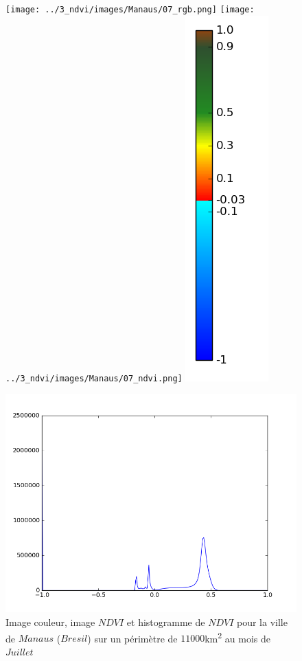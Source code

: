 \documentclass{book}
\begin{document}
\begin{figure}[H]
\centerline{
\texttt{[image: ../3\_ndvi/images/Manaus/07\_rgb.png]}
\texttt{[image: ../3\_ndvi/images/Manaus/07\_ndvi.png]}
\includegraphics[scale=0.4]{../3_ndvi/images/colormap.png}
}
\begin{center}
\includegraphics[scale=0.45]{../3_ndvi/images/Manaus/07_ndvi_histo.png}
\end{center}
\caption{Image couleur, image $NDVI$ et histogramme de $NDVI$ pour la ville de $Manaus$ ($Bresil$) sur un périmètre de $11000$km\textsuperscript{2} au mois de $Juillet$}
\label{manaus_ndvi}
\end{figure}
\end{document}
